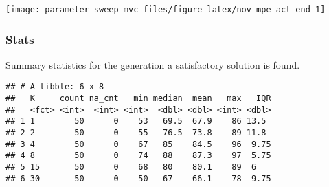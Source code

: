 \documentclass[]{book}
\newenvironment{Shaded}{\begin{snugshade}}{\end{snugshade}}
\newcommand{\DataTypeTok}[1]{\textcolor[rgb]{0.13,0.29,0.53}{#1}}
\newcommand{\DecValTok}[1]{\textcolor[rgb]{0.00,0.00,0.81}{#1}}
\newcommand{\KeywordTok}[1]{\textcolor[rgb]{0.13,0.29,0.53}{\textbf{#1}}}
\newcommand{\NormalTok}[1]{#1}
\newcommand{\OperatorTok}[1]{\textcolor[rgb]{0.81,0.36,0.00}{\textbf{#1}}}
\newcommand{\OtherTok}[1]{\textcolor[rgb]{0.56,0.35,0.01}{#1}}
\newcommand{\StringTok}[1]{\textcolor[rgb]{0.31,0.60,0.02}{#1}}
\begin{document}
\texttt{[image: parameter-sweep-mvc\_files/figure-latex/nov-mpe-act-end-1]}

\hypertarget{stats-57}{%
\subsubsection{Stats}\label{stats-57}}

Summary statistics for the generation a satisfactory solution is found.

\begin{Shaded}
\end{Shaded}

\begin{verbatim}
## # A tibble: 6 x 8
##   K     count na_cnt   min median  mean   max   IQR
##   <fct> <int>  <int> <int>  <dbl> <dbl> <int> <dbl>
## 1 1        50      0    53   69.5  67.9    86 13.5 
## 2 2        50      0    55   76.5  73.8    89 11.8 
## 3 4        50      0    67   85    84.5    96  9.75
## 4 8        50      0    74   88    87.3    97  5.75
## 5 15       50      0    68   80    80.1    89  6   
## 6 30       50      0    50   67    66.1    78  9.75
\end{verbatim}
\end{document}
